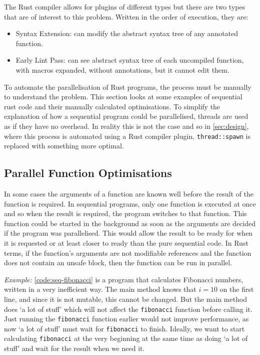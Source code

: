 \documentclass[conference]{IEEEtran}
\begin{document}
The Rust compiler allows for plugins of different types but there are two types that are of interest to this problem. Written in the order of execution, they are:
\begin{itemize}
    \item Syntax Extension: can modify the abstract syntax tree of any annotated function.
    \item Early Lint Pass: can see abstract syntax tree of each uncompiled function, with macros expanded, without annotations, but it cannot edit them.
\end{itemize}

To automate the parallelisation of Rust programs, the process must be manually to understand the problem. This section looks at some examples of sequential rust code and their manually calculated optimisations. To simplify the explanation of how a sequential program could be parallelised, threads are used as if they have no overhead. In reality this is not the case and so in \autoref{sec:design}, where this process is automated using a Rust compiler plugin, \texttt{thread::spawn} is replaced with something more optimal.


\subsection{Parallel Function Optimisations}
In some cases the arguments of a function are known well before the result of the function is required. In sequential programs, only one function is executed at once and so when the result is required, the program switches to that function. This function could be started in the background as soon as the arguments are decided if the program was parallelised. This would allow the result to be ready for when it is requested or at least closer to ready than the pure sequential code.
In Rust terms, if the function's arguments are not modifiable references and the function does not contain an unsafe block, then the function can be run in parallel.

\textit{Example:}
\autoref{code:seq-fibonacci} is a program that calculates Fibonacci numbers, written in a very inefficient way. The main method knows that $i = 10$ on the first line, and since it is not mutable, this cannot be changed. But the main method does `a lot of stuff' which will not affect the \texttt{fibonacci} function before calling it. Just running the \texttt{fibonacci} function earlier would not improve performance, as now `a lot of stuff' must wait for \texttt{fibonacci} to finish. Ideally, we want to start calculating \texttt{fibonacci} at the very beginning at the same time as doing `a lot of stuff' and wait for the result when we need it.
\end{document}
